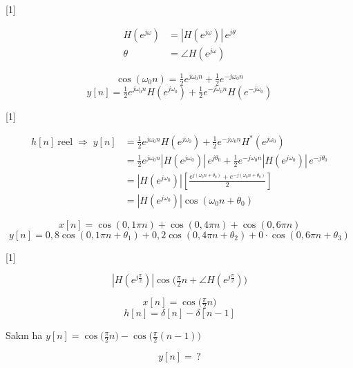 \documentclass[11pt,a4paper]{article}
\begin{document}

[1]

\[ \begin{aligned} H(e^{j\omega}) &= |H(e^{j\omega})|\,e^{j\theta} \\ \theta &= \angle H(e^{j\omega}) \end{aligned} \]

\[ \cos(\omega_0 n) = \tfrac12 e^{j\omega_0 n} + \tfrac12 e^{-j\omega_0 n} \]
\[ y[n] = \tfrac12 e^{j\omega_0 n} H(e^{j\omega_0}) + \tfrac12 e^{-j\omega_0 n} H(e^{-j\omega_0}) \]

[1]


\[ \begin{aligned}
h[n]\ \text{reel} \;\Rightarrow\; y[n] &= \tfrac12 e^{j\omega_0 n} H(e^{j\omega_0}) + \tfrac12 e^{-j\omega_0 n} H^{*}(e^{j\omega_0}) \\
&= \tfrac12 e^{j\omega_0 n} |H(e^{j\omega_0})|\,e^{j\theta_0} + \tfrac12 e^{-j\omega_0 n} |H(e^{j\omega_0})|\,e^{-j\theta_0} \\
&= |H(e^{j\omega_0})| \left[ \frac{e^{j(\omega_0 n+\theta_0)} + e^{-j(\omega_0 n+\theta_0)}}{2} \right] \\
&= |H(e^{j\omega_0})| \cos(\omega_0 n+\theta_0)
\end{aligned} \]

\[ x[n] = \cos(0{,}1\pi n) + \cos(0{,}4\pi n) + \cos(0{,}6\pi n) \]
\[ y[n] = 0{,}8\cos(0{,}1\pi n+\theta_1) + 0{,}2\cos(0{,}4\pi n+\theta_2) + 0\cdot\cos(0{,}6\pi n+\theta_3) \]

[1]

\[ |H(e^{j\frac{\pi}{2}})|\cos\!\Big(\tfrac{\pi}{2}n + \angle H(e^{j\frac{\pi}{2}})\Big) \]

\[ x[n] = \cos\!\Big(\tfrac{\pi}{2}n\Big) \]
\[ h[n] = \delta[n] - \delta[n-1] \]
\begin{dikkat}
Sakın ha $y[n]=\cos\!\big(\tfrac{\pi}{2}n\big)-\cos\!\big(\tfrac{\pi}{2}(n-1)\big)$
\end{dikkat}
\[ y[n] = \,? \]
\end{document}
